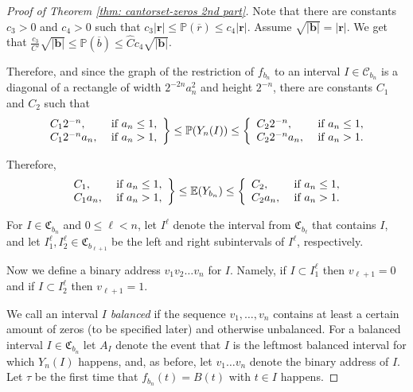 \documentclass[11pt,reqno]{amsart}
\theoremstyle{plain}
\theoremstyle{definition}
\theoremstyle{remark}
\begin{document}
\begin{proof}[Proof of Theorem \ref{thm: cantorset-zeros 2nd part}]
Note that there are constants $c_3>0$ and $c_4>0$ such that $c_3|\textbf{r}|\leq \mathbb{P}(\overline{r}) \leq c_4|\textbf{r}|$. Assume $\sqrt{|\textbf{b}|} = |\textbf{r}|$. We get that $\frac{c_3}{C'}\sqrt{|\textbf{b}|}\leq \mathbb{P}(\overline{b}) \leq \hat{C}c_4\sqrt{|\textbf{b}|}$.

Therefore, and since the graph of the restriction of $f_{b_n}$ to an interval $I \in \mathcal{C}_{b_n}$ is a diagonal of a rectangle of width $2^{-2n}a_n^2$ and height $2^{-n}$, there are constants $C_1$ and $C_2$ such that
\begin{equation} \label{eq: hitting probabilities for diagonal}
\left.\begin{array}{l l} C_12^{-n},& \text{ if }a_n \leq 1, \\ C_1 2^{-n}a_n,& \text{ if } a_n > 1, \end{array}\right\} \leq \mathbb{P}(Y_n(I)) \leq \left\{\begin{array}{l l} C_22^{-n},& \text{ if }a_n \leq 1, \\ C_22^{-n}a_n,& \text{ if } a_n > 1. \end{array}\right.
\end{equation}

Therefore,
\begin{equation} \label{eq: first moment estimates for diagonal}
\left.\begin{array}{l l} C_1,& \text{ if }a_n \leq 1, \\ C_1a_n,& \text{ if } a_n > 1, \end{array}\right\} \leq
\mathbb{E}(Y_{b_n}) \leq \left\{\begin{array}{l l} C_2,& \text{ if }a_n \leq 1, \\ C_2 a_n,& \text{ if } a_n > 1. \end{array}\right.
\end{equation}

For $I \in \mathfrak{C}_{b_n}$ and $0 \leq \ell < n$, let $I^\ell$ denote the interval from $\mathfrak{C}_{b_\ell}$ that contains $I$, and let $I_1^\ell, I_2^\ell \in \mathfrak{C}_{b_{\ell+1}}$ be the left and right subintervals of $I^\ell$, respectively.

Now we define a binary address $v_1 v_2 \dots v_n$ for $I$. Namely, if $I \subset I_1^\ell$ then $v_{\ell+1}=0$ and if $I \subset I_2^\ell$ then $v_{\ell+1}=1$.

We call an interval $I$ {\em balanced} if the sequence $v_1, \dots, v_n$ contains at least a certain amount of zeros (to be specified later) and otherwise unbalanced. For a balanced interval $I \in \mathfrak{C}_{b_n}$ let $A_I$ denote the event that $I$ is the
leftmost balanced interval for which $Y_n(I)$ happens, and, as before, let $v_1 \dots  v_n$ denote the binary address of $I$. Let $\tau$ be the first time that $f_{b_n}(t)=B(t)$ with $t\in I$ happens.


\end{proof}
\end{document}
